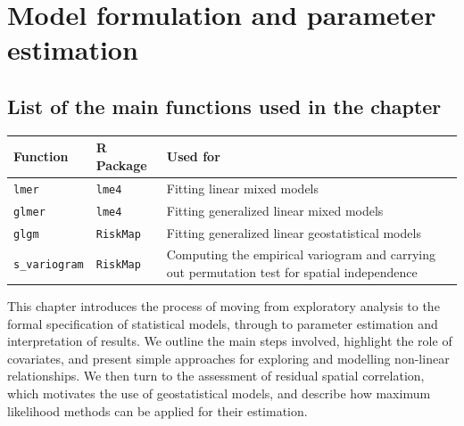 \documentclass[
  letterpaper,
]{krantz}
\begin{document}

\chapter{Model formulation and parameter
estimation}\label{sec-estimation}

\section*{List of the main functions used in the
chapter}\label{list-of-the-main-functions-used-in-the-chapter}


\begin{longtable}[]{@{}
  >{\raggedright\arraybackslash}p{}
  >{\raggedright\arraybackslash}p{}
  >{\raggedright\arraybackslash}p{}@{}}
\toprule\noalign{}
\begin{minipage}[b]{\linewidth}\raggedright
Function
\end{minipage} & \begin{minipage}[b]{\linewidth}\raggedright
R Package
\end{minipage} & \begin{minipage}[b]{\linewidth}\raggedright
Used for
\end{minipage} \\
\midrule\noalign{}
\endhead
\bottomrule\noalign{}
\endlastfoot
\texttt{lmer} & \texttt{lme4} & Fitting linear mixed models \\
\texttt{glmer} & \texttt{lme4} & Fitting generalized linear mixed
models \\
\texttt{glgm} & \texttt{RiskMap} & Fitting generalized linear
geostatistical models \\
\texttt{s\_variogram} & \texttt{RiskMap} & Computing the empirical
variogram and carrying out permutation test for spatial independence \\
\end{longtable}

This chapter introduces the process of moving from exploratory analysis
to the formal specification of statistical models, through to parameter
estimation and interpretation of results. We outline the main steps
involved, highlight the role of covariates, and present simple
approaches for exploring and modelling non-linear relationships. We then
turn to the assessment of residual spatial correlation, which motivates
the use of geostatistical models, and describe how maximum likelihood
methods can be applied for their estimation.
\end{document}
